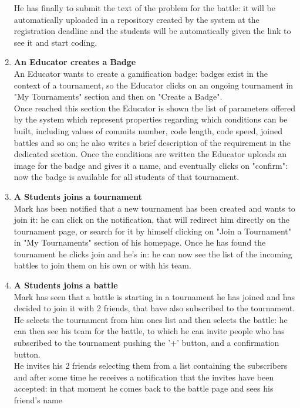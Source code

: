 \documentclass{article}
\begin{document}
\begin{enumerate}
\begin{itemize}
  \end{itemize}
  He has finally to submit the text of the problem for the battle: it will be automatically uploaded in a repository created by the system at the registration
  deadline and the students will be automatically given the link to see it and start coding.\\
  \newpage
  \item \textbf{An Educator creates a Badge\\}An Educator wants to create a gamification badge: badges exist in the context of a tournament, so the Educator clicks on an ongoing tournament
  in "My Tournaments" section and then on "Create a Badge".\\
  Once reached this section the Educator is shown the list of parameters offered by the system which represent properties regarding which conditions can be built, including values of commits number, code length, code speed, joined battles
  and so on; he also writes a brief description of the requirement in the dedicated section.
  Once the conditions are written the Educator uploads an image for the badge and gives it a name, and eventually clicks on "confirm": now the badge is available for all students of that tournament.\\
  \item \textbf{A Students joins a tournament\\} Mark has been notified that a new tournament has been created and wants to join it: he can click on the notification, that will redirect him directly on the tournament page, or search for it by himself clicking on "Join a Tournament" in "My Tournaments"
  section of his homepage. 
  Once he has found the tournament he clicks join and he's in: he can now see the list of the incoming battles to join them on his own or with his team.\\
  \item \textbf{A Students joins a battle\\} Mark has seen that a battle is starting in a tournament he has joined and has decided to join it with 2 friends, that have also subscribed to the tournament.\\
  He selects the tournament from him ones list and then selects the battle: he can then see his team for the battle, to which he can invite people who has subscribed to the tournament pushing the '+' button, and a confirmation button.\\
  He invites his 2 friends selecting them from a list containing the subscribers and after some time he receives a notification that the invites have been accepted: in that moment he comes back to the battle page and sees his friend's name 

\end{enumerate}
\end{document}
